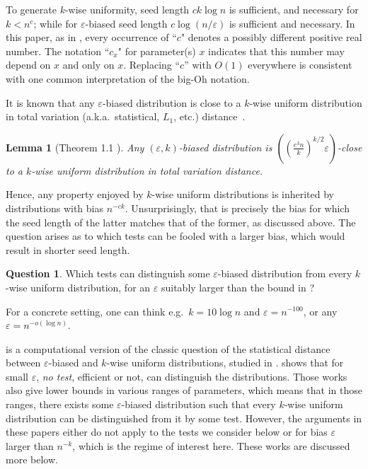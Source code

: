\documentclass[10pt,a4paper]{article}
\newtheorem{lemma}[theorem]{Lemma}
\theoremstyle{definition}
\newtheorem{question}[theorem]{Question}
\newcommand{\eps}{\epsilon}
\def\epsilon{\varepsilon}
\newcommand{\e}{\epsilon}
\begin{document}
To generate $k$-wise uniformity, seed length $ck\log n$ is sufficient, and necessary for $k<n^c$; while for $\e$-biased seed length $c\log(n/\e)$ is sufficient and necessary. In this paper, as in \cite{moti}, every occurrence of ``$c$" denotes a possibly different positive real number.  The notation ``$c_x$" for parameter(s) $x$ indicates that this number may depend on $x$ and only on $x$. Replacing ``$c$'' with $O(1)$ everywhere is consistent with one common interpretation of the big-Oh notation.

It is known that any $\e$-biased distribution is close to a $k$-wise uniform distribution in  total variation (a.k.a.~statistical, $L_1$, etc.) distance~\cite{AGM03,AlonAKMRX07,OZ18}.

\begin{lemma}[Theorem 1.1 \cite{OZ18}] \label{lemma:OZ} 
  Any $(\eps,k)$-biased distribution is $((\frac{e^3n}{k})^{k/2} \eps)$-close to a $k$-wise uniform distribution in total variation distance.
\end{lemma}

Hence, any property enjoyed by $k$-wise uniform distributions is inherited by distributions with bias $n^{-ck}$.  Unsurprisingly, that is precisely the bias for which the seed length of the latter matches that of the former, as discussed above.  The question arises as to which tests can be fooled with a larger bias, which would result in shorter seed length.

\begin{question} \label{question}
Which tests can distinguish some $\eps$-biased distribution from every $k$-wise uniform distribution, for an $\eps$ suitably larger than the bound in ?
\end{question}

For a concrete setting, one can think e.g.~$k = 10 \log n$ and $\eps = n^{-100}$, or any $\eps = n^{-o(\log n)}$.

 is a computational version of the classic question of the statistical distance between $\e$-biased and $k$-wise uniform distributions, studied in \cite{AGM03,AlonAKMRX07,OZ18}.  shows that for small $\e$, \emph{no test}, efficient or not, can distinguish the distributions.  Those works also give lower bounds in various ranges of parameters, which means that in those ranges, there exists some $\eps$-biased distribution such that every $k$-wise uniform distribution can be distinguished from it by some test.  However, the arguments in these papers either do not apply to the tests we consider below or for bias $\eps$ larger than $n^{-k}$, which is the regime of interest here.  These works are discussed more below.
\end{document}
